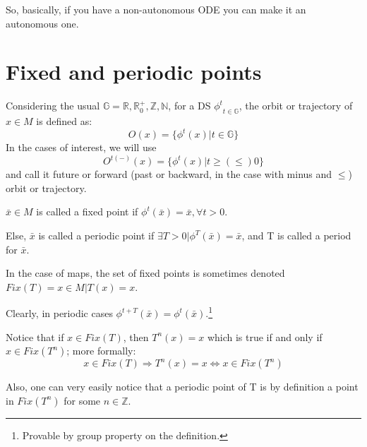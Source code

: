 So, basically, if you have a non-autonomous ODE you can make it an autonomous one.

\section{Fixed and periodic points}
\begin{definition}
    Considering the usual $\mathbb{G}=\mathbb{R}, \mathbb{R}^+_0, \mathbb{Z}, \mathbb{N}$, for a DS ${\phi^t}_{t\in \mathbb{G}}$, the orbit or trajectory of $x\in M$ is defined as:
    \begin{equation*}
        O(x)=\{\phi^t(x)|t\in \mathbb{G}\}
    \end{equation*}
    In the cases of interest, we will use \begin{equation*}
        O^{t(-)}(x)=\{\phi^t(x)|t\geq(\leq)0\}
    \end{equation*}
    and call it future or forward (past or backward, in the case with minus and $\leq$) orbit or trajectory. 
\end{definition}
\begin{definition}
    $\bar{x}\in M$ is called a fixed point if $\phi^t(\bar{x})=\bar{x}, \forall t>0$.

    Else, $\bar{x}$ is called a periodic point if $\exists T>0|\phi^T(\bar{x})=\bar{x}$, and T is called a period for $\bar{x}$. 

    In the case of maps, the set of fixed points is sometimes denoted $Fix(T)={x\in M|T(x)=x} $.
\end{definition}
\begin{observation}
    Clearly, in periodic cases $\phi^{t+T}(\bar{x})=\phi^t(\bar{x})$.\footnote{Provable by group property on the definition.}
\end{observation}
\begin{observation}
    Notice that if $x\in Fix(T)$, then $T^n(x)=x$ which is true if and only if $x\in Fix(T^n)$; more formally:
    \begin{equation*}
        x\in Fix(T)\Rightarrow T^n(x)=x \Leftrightarrow x\in Fix(T^n)
    \end{equation*} 

    Also, one can very easily notice that a periodic point of T is by definition a point in $Fix(T^n)$ for some $n\in\mathbb{Z}$.
\end{observation}

